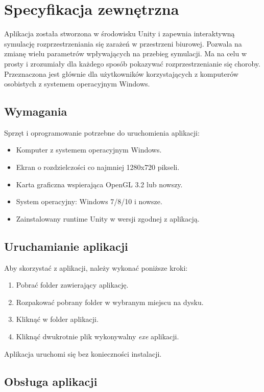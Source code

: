 \chapter{Specyfikacja zewnętrzna}
\label{ch:04}

Aplikacja została stworzona w środowisku Unity i zapewnia interaktywną symulację rozprzestrzeniania się zarażeń w przestrzeni biurowej. Pozwala na zmianę wielu parametrów wpływających na przebieg symulacji. Ma na celu w prosty i zrozumiały dla każdego sposób pokazywać rozprzestrzenianie się choroby. Przeznaczona jest głównie dla użytkowników korzystających z komputerów osobistych z systemem operacyjnym Windows.

\section{Wymagania}

Sprzęt i oprogramowanie potrzebne do uruchomienia aplikacji:
\begin{itemize}
	\item Komputer z systemem operacyjnym Windows.
	\item Ekran o rozdzielczości co najmniej 1280x720 pikseli.
	\item Karta graficzna wspierająca OpenGL 3.2 lub nowszy.
	\item System operacyjny: Windows 7/8/10 i nowsze.
	\item Zainstalowany runtime Unity w wersji zgodnej z aplikacją.
\end{itemize}

\section{Uruchamianie aplikacji}

Aby skorzystać z aplikacji, należy wykonać poniższe kroki:

\begin{enumerate}
	\item Pobrać folder zawierający aplikację.
	\item Rozpakować pobrany folder w wybranym miejscu na dysku.
	\item Kliknąć w folder aplikacji.
	\item Kliknąć dwukrotnie plik wykonywalny \textit{exe} aplikacji.
\end{enumerate}

Aplikacja uruchomi się bez konieczności instalacji.

\section{Obsługa aplikacji}

